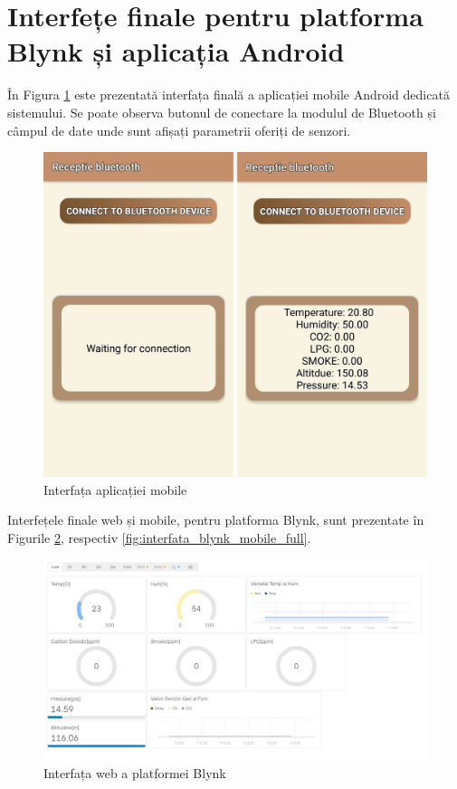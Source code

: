 \section{Interfețe finale pentru platforma Blynk și aplicația Android}

În Figura \ref{fig:interfata_android} este prezentată interfața finală a aplicației mobile Android dedicată sistemului. Se poate observa butonul de conectare la modulul de Bluetooth și câmpul de date unde sunt afișați parametrii oferiți de senzori.

\begin{figure}[H]
\includegraphics[width=0.6\linewidth]{bachelors_ro/images/bt_app_combined_separted.png}
\caption{Interfața aplicației mobile}
\label{fig:interfata_android}
\end{figure}

Interfețele finale web și mobile, pentru platforma Blynk, sunt prezentate în Figurile \ref{fig:interfata_blynk_web}, respectiv \ref{fig:interfata_blynk_mobile_full}.

\begin{figure}[H]
\includegraphics[width=1\linewidth]{bachelors_ro/images/interfata_blynk_web.png}
\caption{Interfața web a platformei Blynk}
\label{fig:interfata_blynk_web}
\end{figure}

